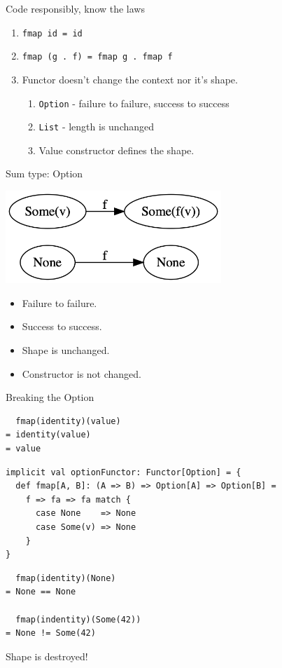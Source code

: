 \documentclass[presentation,aspectratio=169,smaller]{beamer}
\begin{document}
\begin{frame}[label={sec:org1912b83},fragile]{Code responsibly, know the laws}
 \begin{enumerate}
\item <1-> \texttt{fmap id = id}
\item <2-> \texttt{fmap (g . f) = fmap g . fmap f}
\item <3-> Functor doesn't change the context nor it's shape.
\begin{enumerate}
\item \texttt{Option} - failure to failure, success to success
\item \texttt{List} - length is unchanged
\item Value constructor defines the shape.
\end{enumerate}
\end{enumerate}
\end{frame}

\begin{frame}[label={sec:org300e89d}]{Sum type: Option}
\begin{center}
\includegraphics[height=3.5cm]{.dot/functor-option.png}
\end{center}

\begin{itemize}
\item Failure to failure.
\item Success to success.
\item Shape is unchanged.
\item Constructor is not changed.
\end{itemize}
\end{frame}

\begin{frame}[label={sec:orgd24161b},fragile]{Breaking the Option}
 \begin{verbatim}
  fmap(identity)(value)
= identity(value)
= value
\end{verbatim}

\pause

\begin{verbatim}
implicit val optionFunctor: Functor[Option] = {
  def fmap[A, B]: (A => B) => Option[A] => Option[B] =
    f => fa => fa match {
      case None    => None
      case Some(v) => None
    }
}
\end{verbatim}

\pause

\begin{verbatim}
  fmap(identity)(None)
= None == None

  fmap(indentity)(Some(42))
= None != Some(42)
\end{verbatim}

Shape is destroyed!
\end{frame}
\end{document}
